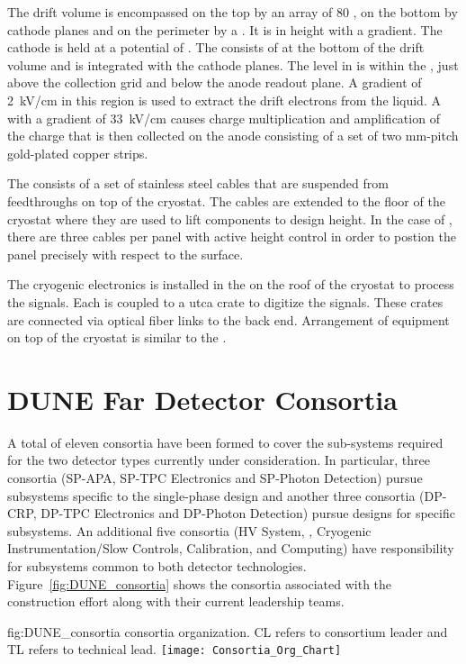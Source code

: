 The drift volume is encompassed on the top by an array of \num{80}
, on the bottom by cathode planes and on the perimeter by a 
. It is \dpmaxdrift %
in height with a
\dpnominaldriftfield %
gradient. The cathode is held at a
potential of \dptargetdriftvoltneg{}. %
The  
consists of \dpnumpmtch %
 at the bottom of the drift volume
and is integrated with the cathode planes.  
The  level in
 is within the , just above the
collection grid and below the anode readout plane. A gradient of
\SI{2}{\kilo\volt/\centi\meter} in this region is used to extract the
drift electrons from the liquid. A  with a gradient of
\SI{33}{\kilo\volt/\centi\meter} causes charge multiplication and
amplification of the charge that  is then collected on the anode 
consisting of a %
set of two \dpstrippitch\si{mm}-pitch %
gold-plated copper strips.

The   consists of a set of stainless steel
cables that are suspended from feedthroughs on top of the
cryostat. The cables are extended to the floor of the cryostat where
they are used to lift components to design height. In the case of
, there are three cables per panel with active height
control in order to postion the panel precisely with respect to the
 surface.

The cryogenic  electronics is installed in the  on the roof of the cryostat to process the
 signals. Each  is coupled to a {utca} crate to
digitize the signals. These crates are connected via optical fiber links to the 
back end. Arrangement of equipment on top of the cryostat is similar to the .

\section{DUNE Far Detector Consortia}
\label{sec:fdconsortia}

A total of eleven  consortia have been formed to cover 
the sub-systems required for the two detector types currently under
consideration.  In particular, three consortia (SP-APA, SP-TPC
Electronics and SP-Photon Detection) pursue subsystems specific to
the single-phase design and another three consortia (DP-CRP, DP-TPC
Electronics and DP-Photon Detection) pursue designs for 
specific subsystems.  An additional five consortia (HV System, ,
Cryogenic Instrumentation/Slow Controls, Calibration, and Computing)
have responsibility for subsystems common to both detector
technologies.  Figure~\ref{fig:DUNE_consortia} shows the consortia 
associated with the  construction effort along with their 
current leadership teams.  
\begin{dunefigure}{fig:DUNE_consortia}
  { consortia organization. CL refers to consortium leader and TL refers to technical lead.}
  \texttt{[image: Consortia\_Org\_Chart]}
\end{dunefigure}

